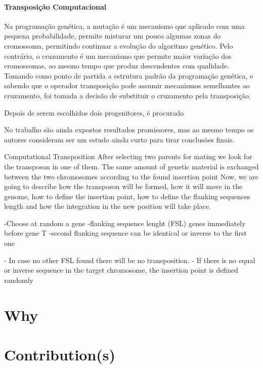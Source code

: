\documentclass[12pt,portuguese,a4paper]{article}
\begin{document}
\paragraph{Transposição Computacional}

Na programação genética, a mutação é um mecanismo que aplicado com uma pequena probabilidade, permite misturar um pouco algumas zonas do cromossoma, permitindo continuar a evolução do algoritmo genético. Pelo contrário, o cruzamento é um mecanismo que permite maior variação dos cromossomas, ao mesmo tempo que produz descendentes com qualidade.  Tomando como ponto de partida a estrutura padrão da programação genética, e sabendo que o operador transposição pode assumir mecanismos semelhantes ao cruzamento, foi tomada a decisão de substituir o cruzamento pela transposição.

Depois de serem escolhidos dois progenitores, é procurado

No trabalho \cite{Simoes99transposition:a} são ainda expostos resultados promissores, mas ao mesmo tempo os autores consideram ser um estudo ainda curto para tirar conclusões finais.



Computational Transposition
After selecting two parents for mating we look for the transposon in one of them.
The same amount of genetic material is exchanged between the two chromosomes according to the found insertion point
Now, we are going to describe how the transposon will be formed, how it will move in the genome, how to define the insertion point, how to define the flanking sequences length and how the integration in the new position will take place.

-Choose at random a gene
-flanking sequence lenght (FSL) genes immediately before gene T
-second flanking sequence can be identical or inverse to the first one

- In case no other FSL found there will be no transposition.
- If there is no equal or inverse sequence in the target chromosome, the insertion point is defined randomly


\section{Why}


\section{Contribution(s)}
\end{document}
